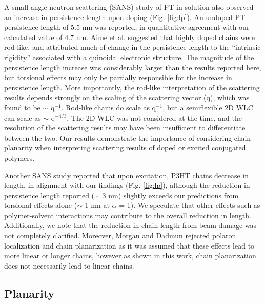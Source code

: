 A small-angle neutron scattering (SANS) study of PT in solution also observed an increase in persistence length upon doping (Fig. \ref{fig:lp}).\cite{Aime1989} An undoped PT persistence length of 5.5 nm was reported, in quantitative agreement with our calculated value of 4.7 nm. Aime et al. suggested that highly doped chains were rod-like, and attributed much of change in the persistence length to the ``intrinsic rigidity'' associated with a quinoidal electronic structure. The magnitude of the persistence length increase was considerably larger than the results reported here, but torsional effects may only be partially responsible for the increase in persistence length. More importantly, the rod-like interpretation of the scattering results depends strongly on the scaling of the scattering vector (q), which was found to be $\sim$ q$^{-1}$. Rod-like chains do scale as q$^{-1}$,\cite{Pedersen1997} but a semiflexible 2D WLC can scale as $\sim$ q$^{-4/3}$.\cite{Cifra2008} The 2D WLC was not considered at the time, and the resolution of the scattering results may have been insufficient to differentiate between the two. Our results demonstrate the importance of considering chain planarity when interpreting scattering results of doped or excited conjugated polymers.

Another SANS study reported that upon excitation, P3HT chains decrease in length, in alignment with our findings (Fig. \ref{fig:lp}), although the reduction in persistence length reported ($\sim$ 3 nm) slightly exceeds our predictions from torsional effects alone ($\sim$ 1 nm at $\alpha$ = 1).\cite{Morgan2016} We speculate that other effects such as polymer-solvent interactions may contribute to the overall reduction in length. Additionally, we note that the reduction in chain length from beam damage was not completely clarified. Moreover, Morgan and Dadmun rejected polaron localization and chain planarization as it was assumed that these effects lead to more linear or longer chains, however as shown in this work, chain planarization does not necessarily lead to linear chains.

\subsection{Planarity}

